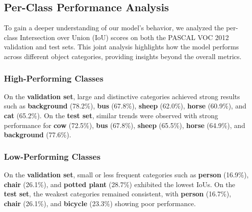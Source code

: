 \subsection{Per-Class Performance Analysis}
\label{subsec:per_class_performance_analysis}

To gain a deeper understanding of our model’s behavior, we analyzed the per-class Intersection over Union (IoU) scores on both the PASCAL VOC 2012 validation and test sets. This joint analysis highlights how the model performs across different object categories, providing insights beyond the overall metrics.

\subsubsection{High-Performing Classes}

On the \textbf{validation set}, large and distinctive categories achieved strong results such as \textbf{background} (78.2\%), \textbf{bus} (67.8\%), \textbf{sheep} (62.0\%), \textbf{horse} (60.9\%), and \textbf{cat} (65.2\%).  
On the \textbf{test set}, similar trends were observed with strong performance for \textbf{cow} (72.5\%), \textbf{bus} (67.8\%), \textbf{sheep} (65.5\%), \textbf{horse} (64.9\%), and \textbf{background} (77.6\%).

\subsubsection{Low-Performing Classes}

On the \textbf{validation set}, small or less frequent categories such as \textbf{person} (16.9\%), \textbf{chair} (26.1\%), and \textbf{potted plant} (28.7\%) exhibited the lowest IoUs.  
On the \textbf{test set}, the weakest categories remained consistent, with \textbf{person} (16.7\%), \textbf{chair} (26.1\%), and \textbf{bicycle} (23.3\%) showing poor performance.


